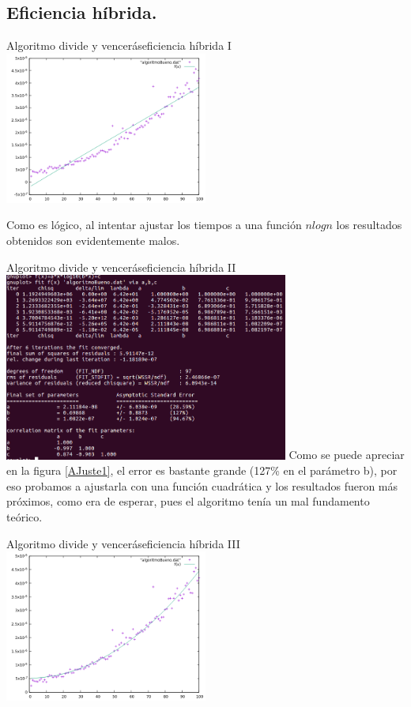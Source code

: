 \documentclass{beamer}
\begin{document}
\subsection{Eficiencia híbrida.}
\begin{frame}{Algoritmo divide y vencerás}{eficiencia híbrida I}
	\includegraphics[width=0.5\textwidth]{algBueno(log).png}

Como es lógico, al intentar ajustar los tiempos a una función $nlogn$ los resultados obtenidos son evidentemente malos.
\end{frame}
\begin{frame}{Algoritmo divide y vencerás}{eficiencia híbrida II}
	\includegraphics[width=0.7\textwidth]{dyvajuste1.png}
Como se puede apreciar en la figura \ref{AJuste1}, el error es bastante grande (127\% en el parámetro b), por eso probamos a ajustarla con una función cuadrática y los resultados fueron más próximos, como era de esperar, pues el algoritmo tenía un mal fundamento teórico.
\end{frame}
\begin{frame}{Algoritmo divide y vencerás}{eficiencia híbrida III}
	\includegraphics[width=0.5\textwidth]{algBueno(n2).png}
\end{frame}
\end{document}
